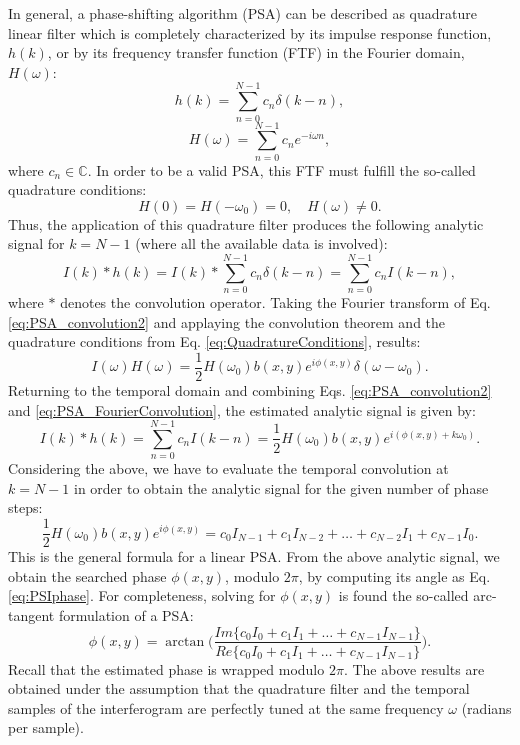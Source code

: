 In general, a phase-shifting algorithm (PSA) can be described as quadrature linear
filter which is completely characterized by its impulse response function, $h(k)$,
or by its frequency transfer function (FTF) in the Fourier domain, $H(\omega)$:
\begin{equation}
 h(k)=\sum^{N-1}_{n=0} c_n \delta(k-n),
\end{equation}
\begin{equation}
 H(\omega)=\sum^{N-1}_{n=0} c_n e^{-i\omega n},
\end{equation}
where ${c_n} \in \mathbb{C}$. In order to be a valid PSA, this FTF must fulfill
the so-called quadrature conditions:
\begin{equation}\label{eq:QuadratureConditions}
 H(0)=H(-\omega_0)=0, \quad H(\omega)\not=0.
\end{equation}
Thus, the application of this quadrature filter produces the following analytic
signal for $k = N-1$ (where all the available data is involved):
\begin{equation}\label{eq:PSA_convolution2}
 I(k)*h(k)=I(k)*\sum^{N-1}_{n=0} c_n \delta(k-n) = \sum^{N-1}_{n=0} c_n I(k-n),
\end{equation}
where $*$ denotes the convolution operator. Taking the Fourier transform of Eq. 
\eqref{eq:PSA_convolution2} and applaying the convolution theorem and the 
quadrature conditions from Eq. \eqref{eq:QuadratureConditions}, results:
\begin{equation}\label{eq:PSA_FourierConvolution}
 I(\omega)H(\omega)= \frac{1}{2} H(\omega_0)b(x,y) e^{i\phi(x,y)} \delta(\omega-
\omega_0).
\end{equation}
Returning to the temporal domain and combining Eqs. 
\eqref{eq:PSA_convolution2} and \eqref{eq:PSA_FourierConvolution}, the estimated 
analytic signal is given by:
\begin{equation}
 I(k)*h(k)= \sum^{N-1}_{n=0} c_n I(k-n) = \frac{1}{2} H(\omega_0)b(x,y) 
e^{i(\phi(x,y)+k\omega_0)}.
\end{equation}
Considering the above, we have to evaluate the temporal convolution at $k=N-1$ in
order to obtain the analytic signal for the given number of phase steps:
\begin{equation}
  \frac{1}{2} H(\omega_0)b(x,y) e^{i\phi(x,y)} = c_0 I_{N-1} + c_1 I_{N-2}+ \dots 
  + c_{N-2} I_{1}+ c_{N-1} I_{0}.
\end{equation}
This is the general formula for a linear PSA.
From the above analytic signal, we obtain the searched phase $\phi(x,y)$, modulo
$2\pi$, by computing its angle as Eq. \eqref{eq:PSIphase}. For completeness, 
solving for $\phi(x,y)$ is found the so-called arc-tangent formulation of a PSA:
\begin{equation}
 \phi(x,y) = \arctan \Bigg(\frac{Im\{c_0I_0+c_1I_1 + \dots + c_{N-1}
I_{N-1}\}}{Re\{c_0I_0+c_1I_1 + \dots + c_{N-1} I_{N-1}\}}  \Bigg).
\end{equation}
Recall that the estimated phase is wrapped modulo $2 \pi$.
The above results are obtained under the assumption that the quadrature filter
and the temporal samples of the interferogram are perfectly tuned at the same
frequency $\omega$ (radians per sample). 

